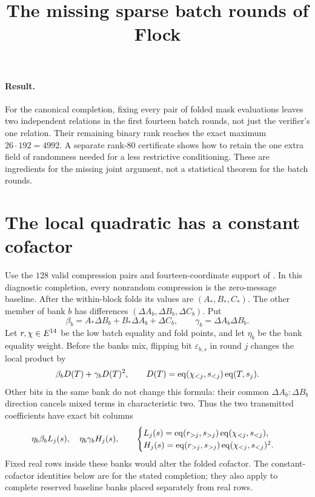 \documentclass[11pt]{article}
\title{The missing sparse batch rounds of Flock}
\author{}
\date{}
\begin{document}
\maketitle
\vspace{-2em}

\paragraph{Result.} For the canonical completion, fixing every pair of folded mask evaluations leaves two independent relations in the first fourteen batch rounds, not just the verifier's one relation. Their remaining binary rank reaches the exact maximum $26\cdot192=4992$. A separate rank-$80$ certificate shows how to retain the one extra field of randomness needed for a less restrictive conditioning. These are ingredients for the missing joint argument, not a statistical theorem for the batch rounds.

\section{The local quadratic has a constant cofactor}

Use the $128$ valid compression pairs and fourteen-coordinate support of . In this diagnostic completion, every nonrandom compression is the zero-message baseline. After the within-block folds its values are $(A_*,B_*,C_*)$. The other member of bank $b$ has differences $(\Delta A_b,\Delta B_b,\Delta C_b)$. Put
\[
 \beta_b=A_*\Delta B_b+B_*\Delta A_b+\Delta C_b,
 \qquad \gamma_b=\Delta A_b\Delta B_b.
\]
Let $r,\chi\in E^{14}$ be the low batch equality and fold points, and let $\eta_b$ be the bank equality weight. Before the banks mix, flipping bit $\varepsilon_{b,s}$ in round $j$ changes the local product by
\[
 \beta_b D(T)+\gamma_b D(T)^2,
 \qquad D(T)=\operatorname{eq}(\chi_{<j},s_{<j})\operatorname{eq}(T,s_j).
\]
Other bits in the same bank do not change this formula: their common $\Delta A_b:\Delta B_b$ direction cancels mixed terms in characteristic two. Thus the two transmitted coefficients have exact bit columns
\[
 \eta_b\beta_b L_j(s),\quad \eta_b\gamma_b H_j(s),
 \qquad
 \begin{cases}
 L_j(s)=\operatorname{eq}(r_{>j},s_{>j})\operatorname{eq}(\chi_{<j},s_{<j}),\\
 H_j(s)=\operatorname{eq}(r_{>j},s_{>j})\operatorname{eq}(\chi_{<j},s_{<j})^2.
 \end{cases}
\]
Fixed real rows inside these banks would alter the folded cofactor. The constant-cofactor identities below are for the stated completion; they also apply to complete reserved baseline banks placed separately from real rows.
\end{document}
